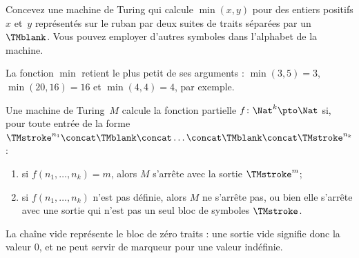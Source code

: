 \documentclass[../../../include/open-logic-section]{subfiles}
\begin{document}
\begin{prob}
Concevez une machine de Turing qui calcule
$\min(x,y)$ pour des entiers positifs $x$ et~$y$
représentés sur le ruban par deux suites de traits
séparées par un~$\TMblank$. Vous pouvez employer
d'autres symboles dans l'alphabet de la machine.

La fonction $\min$ retient le plus petit de ses
arguments : $\min(3,5)=3$, $\min(20,16)=16$ et
$\min(4,4)=4$, par exemple.
\end{prob}

\begin{defn}
Une machine de Turing~$M$ calcule la fonction
partielle $f\colon\Nat^k\pto\Nat$ si, pour toute
entrée de la forme
$\TMstroke^{n_1}\concat\TMblank\concat
\dots\concat\TMblank\concat\TMstroke^{n_k}$ :
\begin{enumerate}
\item si $f(n_1,\dots,n_k)=m$, alors $M$ s'arrête
  avec la sortie $\TMstroke^m$;
\item si $f(n_1,\dots,n_k)$ n'est pas définie,
  alors $M$ ne s'arrête pas, ou bien elle s'arrête
  avec une sortie qui n'est pas un seul bloc de
  symboles $\TMstroke$.
\end{enumerate}
La chaîne vide représente le bloc de zéro traits : une sortie vide signifie donc la valeur $0$, et ne peut servir de marqueur pour une valeur indéfinie. \end{defn}
\end{document}

